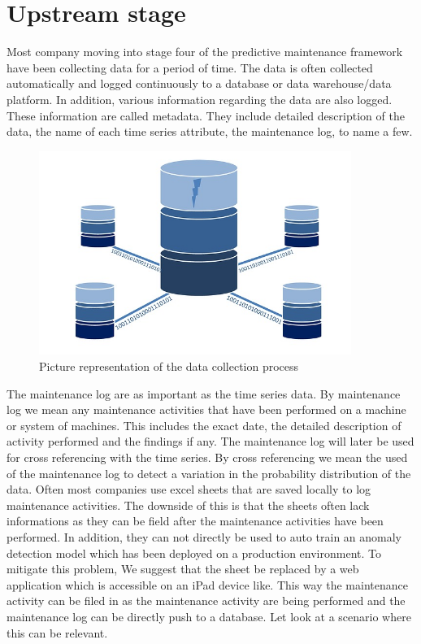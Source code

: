 \documentclass[11pt, oneside]{article}   	%
\begin{document}
\section{Upstream stage}
Most company moving into stage four of the predictive maintenance framework have been collecting data for a period of time. The data is often collected automatically and logged continuously to a database or data warehouse/data platform. In addition, various information regarding the data are also logged. These information are called metadata. They include detailed description of the data, the name of each time series attribute, the maintenance log, to name a few. 

\begin{figure}[H] %
   \centering
   \includegraphics[width=4in]{database.jpg} 
   \caption{Picture representation of the data collection process}
   \label{fig:db}
\end{figure}
\justify
The maintenance log are as important as the time series data. By maintenance log we mean any maintenance activities that have been performed on a machine or system of machines. This includes the exact date, the detailed description of activity performed and the findings if any. The maintenance log will later be used for cross referencing with the time series. By cross referencing we mean the used of the maintenance log to detect a variation in the probability distribution of the data.
\justify
Often most companies use excel sheets that are saved locally to log maintenance activities. The downside of this is that the sheets often lack informations as they can be field after the maintenance activities have been performed. In addition, they can not directly be used to auto train an anomaly detection model which has been deployed on a production environment. To mitigate this problem,
We suggest that the sheet be replaced by a web application which is accessible on an iPad device like. This way the maintenance activity can be filed in as the maintenance activity are being performed and the maintenance log can be directly push to a database. Let look at a scenario where this can be relevant.
\end{document}
